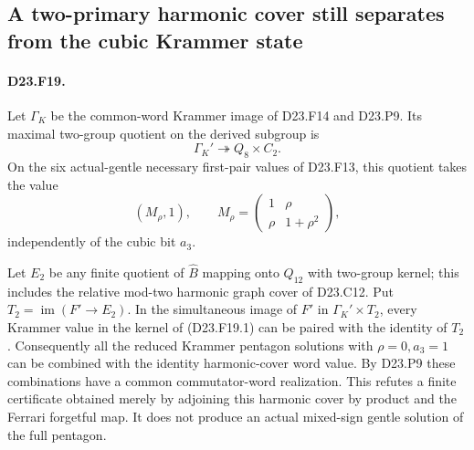 \subsection{A two-primary harmonic cover still separates from the cubic Krammer state}

\paragraph{D23.F19.}
Let $\Gamma_K$ be the common-word Krammer image of
D23.F14 and D23.P9. Its maximal two-group quotient
on the derived subgroup is
\[
 \Gamma_K'\twoheadrightarrow Q_8\times C_2.
\tag{D23.F19.1}
\]
On the six actual-gentle necessary first-pair values
of D23.F13, this quotient takes the value
\[
 \left(M_\rho,1\right),\qquad
 M_\rho=\begin{pmatrix}1&\rho\\\rho&1+\rho^2\end{pmatrix},
\tag{D23.F19.2}
\]
independently of the cubic bit $a_3$.

Let $E_2$ be any finite quotient of $\widehat B$
mapping onto $Q_{12}$ with two-group kernel; this
includes the relative mod-two harmonic graph
cover of D23.C12. Put $T_2=\operatorname{im}(F'\to E_2)$.
In the simultaneous image of $F'$ in
$\Gamma_K'\times T_2$, every Krammer value in the
kernel of (D23.F19.1) can be paired with the
identity of $T_2$.
Consequently all the reduced Krammer pentagon
solutions with $\rho=0,a_3=1$ can be combined
with the identity harmonic-cover word value.
By D23.P9 these combinations have a common
commutator-word realization. This refutes a
finite certificate obtained merely by adjoining
this harmonic cover by product and the Ferrari
forgetful map. It does not produce an actual
mixed-sign gentle solution of the full pentagon.

